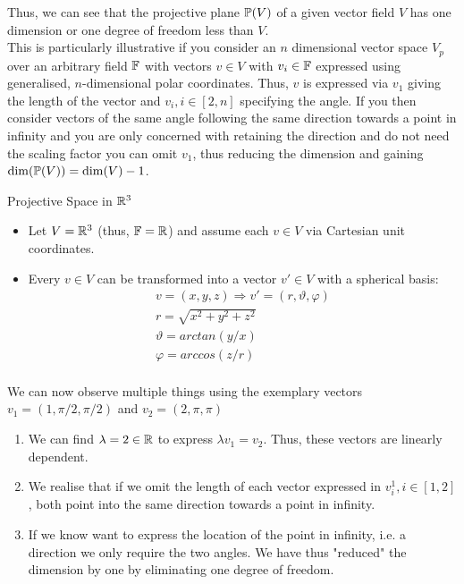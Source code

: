 Thus, we can see that the projective plane $\mathbb{P}(V)$ of a given vector field $V$ has one dimension or one degree of freedom less than $V$. \\
This is particularly illustrative if you consider an $n$ dimensional vector space $V_p$ over an arbitrary field $\mathbb{F}$ with vectors $v\in V$ with $v_i \in \mathbb{F}$ expressed using generalised, $n$-dimensional polar coordinates. Thus, $v$ is expressed via $v_1$ giving the length of the vector and $v_i, i \in [2,n]$ specifying the angle. If you then consider vectors of the same angle following the same direction towards a point in infinity and you are only concerned with retaining the direction and do not need the scaling factor you can omit $v_1$, thus reducing the dimension and gaining $\mathrm{dim}(\mathbb{P}(V)) = \mathrm{dim}(V) - 1$. 


\begin{exampleBox}{Projective Space in $\mathbb{R}^3$}
    \begin{itemize}
        \item Let $V = \mathbb{R}^3$ (thus, $\mathbb{F} = \mathbb{R}$) and assume each $v \in V$ via Cartesian unit coordinates.
        \item Every $v \in V$ can be transformed into a vector $v' \in V$ with a spherical basis: 
            \begin{gather*}
                v = (x,y,z) \Rightarrow v' =  (r, \vartheta,\varphi)  \\
                r = \sqrt{x^2+y^2+z^2} \\
                \vartheta = arctan(y/x) \\
                \varphi = arccos(z/r) \\   
            \end{gather*}
    \end{itemize}  
    
    We can now observe multiple things using the exemplary vectors $v_1 = (1, \pi/2,\pi/2)$ and $v_2 = (2, \pi,\pi)$
    \begin{enumerate}
        \item We can find $\lambda = 2 \in \mathbb{R}$ to express $\lambda v_1 = v_2$. Thus, these vectors are linearly dependent.
        \item We realise that if we omit the length of each vector expressed in $v_i^1, i \in [1,2]$, both point into the same direction towards a point in infinity.
        \item If we know want to express the location of the point in infinity, i.e. a direction we only require the two angles. We have thus "reduced" the dimension by one by eliminating one degree of freedom.
    \end{enumerate}
\end{exampleBox}


